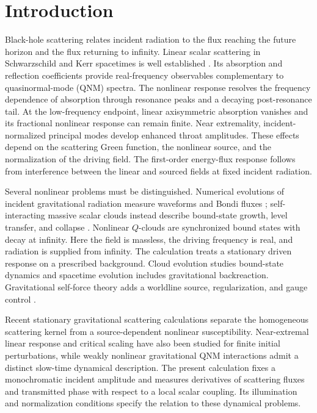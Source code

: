 \documentclass[aps,prd,twocolumn,10pt,nofootinbib,superscriptaddress,floatfix]{revtex4-2}
\begin{document}
\maketitle
\section{Introduction}

Black-hole scattering relates incident radiation to the flux reaching the
future horizon and the flux returning to infinity.  Linear scalar scattering
in Schwarzschild and Kerr spacetimes is well established
\cite{Sanchez1976,Futterman,GlampedakisAndersson2001}.  Its absorption and
reflection coefficients provide real-frequency observables complementary to
quasinormal-mode (QNM) spectra\cite{Berti2009,Kyutoku2023,Rosato2024}.
The nonlinear response resolves the frequency dependence of absorption
through resonance peaks and a decaying post-resonance tail.
At the low-frequency endpoint, linear axisymmetric absorption vanishes
and its fractional nonlinear response can remain finite.  Near extremality,
incident-normalized principal modes develop enhanced throat amplitudes.
These effects depend on the scattering Green function, the nonlinear source,
and the normalization of the driving field.  The first-order energy-flux response follows
from interference between the linear and sourced fields at fixed incident
radiation.

Several nonlinear problems must be distinguished.  Numerical evolutions of
incident gravitational radiation measure waveforms and Bondi fluxes
\cite{Zlochower2003,Frauendiener2021}; self-interacting massive scalar clouds
instead describe bound-state growth, level transfer, and collapse
\cite{YoshinoKodama2012,Baryakhtar2021}.  Nonlinear $Q$-clouds are synchronized
bound states with decay at infinity\cite{HerdeiroQCloud2014}.  Here the field
is massless, the driving frequency is real, and radiation is supplied from
infinity.  The calculation treats a stationary driven response on a prescribed
background.  Cloud evolution studies bound-state dynamics and spacetime
evolution includes gravitational backreaction.  Gravitational self-force
theory adds a worldline source, regularization, and gauge control
\cite{BarackPound2019,PoundWardell2021}.

Recent stationary gravitational scattering calculations separate the
homogeneous scattering kernel from a source-dependent nonlinear
susceptibility\cite{CardosoNonlinear2026}.  Near-extremal linear response
and critical scaling have also been studied for finite initial
perturbations\cite{GrallaTransient2016,GrallaCritical2018}, while weakly
nonlinear gravitational QNM interactions admit a distinct slow-time
dynamical description\cite{IulianoWeather2025}.
The present calculation fixes a monochromatic incident amplitude and
measures derivatives of scattering fluxes and transmitted phase with
respect to a local scalar coupling.  Its illumination and normalization
conditions specify the relation to these dynamical problems.
\end{document}
